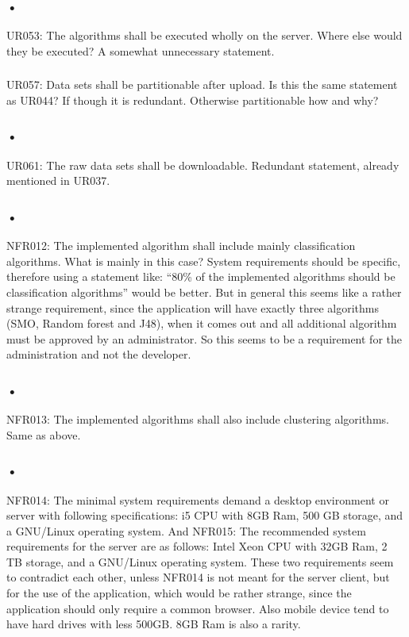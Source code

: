 \documentclass{article}
\begin{document}
\subsubsection{•}
UR053: The algorithms shall be executed wholly on the server.
Where else would they be executed? A somewhat unnecessary statement.

\subsubsection{}
UR057: Data sets shall be partitionable after upload.
Is this the same statement as UR044? If though it is redundant. Otherwise partitionable how and why?

\subsubsection{•}
UR061: The raw data sets shall be downloadable.
Redundant statement, already mentioned in UR037.

\subsubsection{•}
NFR012: The implemented algorithm shall include mainly classification algorithms.
What is mainly in this case? System requirements should be specific, therefore using a statement like: “80\% of the implemented algorithms should be classification algorithms” would be better. But in general this seems like a rather strange requirement, since the application will have exactly three algorithms (SMO, Random forest and J48), when it comes out and all additional algorithm must be approved by an administrator. So this seems to be a requirement for the administration and not the developer.

\subsubsection{•}
NFR013: The implemented algorithms shall also include clustering algorithms.
Same as above.

\subsubsection{•}
NFR014: The minimal system requirements demand a desktop environment or server with following specifications: i5 CPU with 8GB Ram, 500 GB storage, and a GNU/Linux operating system. And
NFR015: The recommended system requirements for the server are as follows: Intel Xeon CPU with 32GB Ram, 2 TB storage, and a GNU/Linux operating system.
These two requirements seem to contradict each other, unless NFR014 is not meant for the server client, but for the use of the application, which would be rather strange, since the application should only require a common browser. Also mobile device tend to have hard drives with less 500GB. 8GB Ram is also a rarity.
\end{document}
